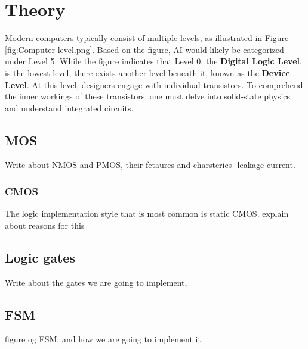 \section{Theory}

Modern computers typically consist of multiple levels\cite[Page 2]{tanenbaum_2012_structured}, as illustrated in Figure \ref{fig:Computer-level.png}. Based on the figure, AI would likely be categorized under Level 5. While the figure indicates that Level 0, the \textbf{Digital Logic Level}, is the lowest level, there exists another level beneath it, known as the \textbf{Device Level}. At this level, designers engage with individual transistors. To comprehend the inner workings of these transistors, one must delve into solid-state physics and understand integrated circuits.
\subsection{MOS}

Write about NMOS and PMOS, their fetaures and charsterics
-leakage current.
\subsubsection{CMOS}

The logic implementation style that is most common is static CMOS.
explain about reasons for this

\subsection{Logic gates}
Write about the gates we are going to implement, 

\subsection{FSM}
figure og FSM, and how we are going to implement it 
